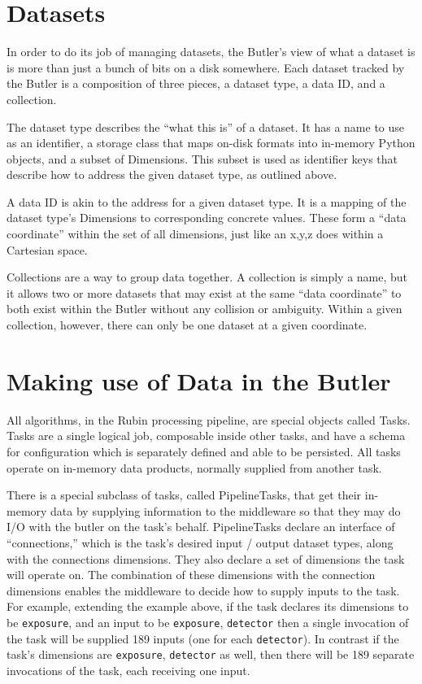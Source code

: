 \documentclass[11pt,twoside]{article}
\begin{document}
\section{Datasets}
In order to do its job of managing datasets, the Butler's view of what a dataset is is more than just a bunch of bits on a disk somewhere. Each dataset tracked by the Butler is a composition of three pieces, a dataset type, a data ID, and a collection.

The dataset type describes the ``what this is'' of a dataset. It has a name to use as an identifier, a storage class that maps on-disk formats into in-memory Python objects, and a subset of Dimensions. This subset is used as identifier keys that describe how to address the given dataset type, as outlined above.

A data ID is akin to the address for a given dataset type. It is a mapping of the dataset type's Dimensions to corresponding concrete values. These form a ``data coordinate'' within the set of all dimensions, just like an x,y,z does within a Cartesian space.

Collections are a way to group data together. A collection is simply a name, but it allows two or more datasets that may exist at the same ``data coordinate'' to both exist within the Butler without any collision or ambiguity. Within a given collection, however, there can only be one dataset at a given coordinate.

\section{Making use of Data in the Butler}
All algorithms, in the Rubin processing pipeline, are special objects called Tasks. Tasks are a single logical job, composable inside other tasks, and have a schema for configuration which is separately defined and able to be persisted. All tasks operate on in-memory data products, normally supplied from another task.

There is a special subclass of tasks, called PipelineTasks, that get their in-memory data by supplying information to the middleware so that they may do I/O with the butler on the task's behalf. PipelineTasks declare an interface of ``connections,'' which is the task's desired input / output dataset types, along with the connections dimensions. They also declare a set of dimensions the task will operate on. The combination of these dimensions with the connection dimensions enables the middleware to decide how to supply inputs to the task. For example, extending the example above, if the task declares its dimensions to be \texttt{exposure}, and an input to be \texttt{exposure}, \texttt{detector} then a single invocation of the task will be supplied 189 inputs (one for each \texttt{detector}). In contrast if the task's dimensions are \texttt{exposure}, \texttt{detector} as well, then there will be 189 separate invocations of the task, each receiving one input.
\end{document}
